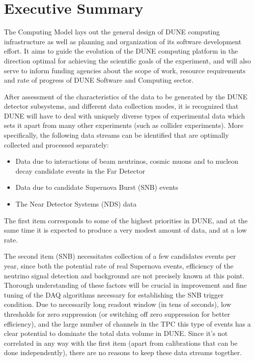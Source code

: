 \section{Executive Summary}
The Computing Model lays out the general design of DUNE computing infrastructure as well as planning and
organization of its software development effort. It aims to guide the evolution of the DUNE computing
platform in the direction optimal for achieving the scientific goals of the experiment, and will also serve
to inform funding agencies about the scope of work, resource requirements and rate of progress of 
DUNE Software and Computing sector.

After assessment of the characteristics of the data to be generated by the DUNE detector subsystems,
and different data collection modes, it is recognized that DUNE will have to deal with uniquely diverse
types of experimental data which sets it apart from many other experiments (such as collider experiments). More specifically,
the following data streams can be identified that are optimally collected and processed separately:

\begin{itemize}

\item Data due to interactions of beam neutrinos, cosmic muons and to nucleon decay candidate events in the Far Detector

\item Data due to candidate Supernova Burst (SNB) events

\item The Near Detector Systems (NDS) data

\end{itemize}

The first item corresponds to some of the highest priorities in DUNE, and at the same time it is expected to produce
a very modest amount of data, and at a low rate.

The second item (SNB) necessitates collection of a few candidates
events per year, since both the potential rate of real Supernova events, efficiency of the neutrino signal detection
and background are not precisely known at this point. Thorough understanding of these factors will be crucial
in improvement and fine tuning of the DAQ algorithms necessary for establishing the SNB trigger condition.
Due to necessarily long readout window (in tens of seconds), low thresholds for zero suppression (or switching
off zero suppression for better efficiency), and the large number of channels in the TPC this type of events
has a clear potential to dominate the total data volume in DUNE. Since it's not correlated in any way with the
first item (apart from calibrations that can be done independently), there are no reasons to keep these
data streams together.

